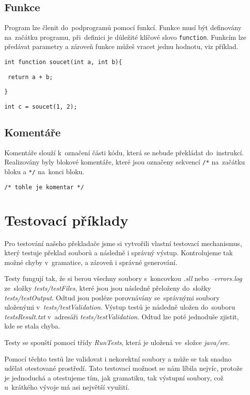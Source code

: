\documentclass[czech]{thesiskiv}
\begin{document}
\section{Funkce}
Program lze členit do~podprogramů pomocí funkcí.
Funkce musí být definovány na~začátku programu, při~definici je důležité klíčové slovo
\texttt{function}. Funkcím lze předávat parametry a zároveň funkce můžeš vracet jednu hodnotu, viz příklad.


\texttt{int function soucet(int a, int b)\{}

\texttt{    return a + b;}

\texttt{\}}


\texttt{int c = soucet(1, 2);}

\section{Komentáře}
Komentáře slouží k~označení části kódu, která se nebude překládat do~instrukcí.
Realizovány byly blokové komentáře, které jsou označeny sekvencí \texttt{/*} na~začátku bloku
a \texttt{*/} na~konci bloku.


\texttt{/* tohle je komentar */}

               
\chapter{Testovací příklady}
Pro testování našeho překladače jsme si vytvořili vlastní testovací mechanismus, který testuje překlad souborů a následně i správný výstup. 
Kontrolujeme tak možné chyby v~gramatice, a zároveň i správné generování.


Testy fungují tak, že si berou všechny soubory s~koncovkou \textit{.sll} nebo \textit{–errors.log} ze~složky \textit{tests/testFiles}, které jsou jsou následně 
přeloženy do~složky \textit{tests/testOutput}. Odtud jsou posléze porovnávány se~správnými soubory uloženými v~\textit{tests/testValidation}. 
Výstup testů je následně uložen do~souboru \textit{testsResult.txt} v~adresáři \textit{tests/testValidation}. 
Odtud lze poté jednoduše zjistit, kde se stala chyba. 


Testy se spouští pomocí třídy \textit{RunTests}, která je uložená ve~složce \textit{java/src}.


Pomocí těchto testů lze validovat i nekorektní soubory a může se tak snadno udělat otestované prostředí. 
Tato testovací možnost se nám líbila nejvíc, protože je jednoduchá a otestujeme tím, jak gramatiku, tak výstupní soubory, 
což u~krátkého vývoje má asi největší využití.
\end{document}
